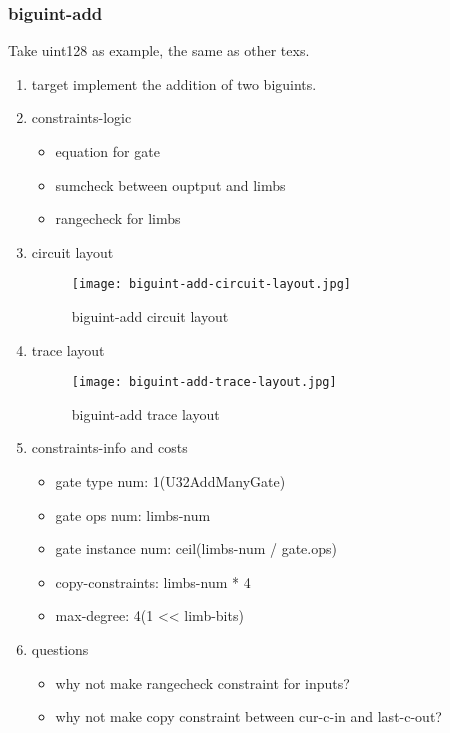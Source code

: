 \subsubsection{biguint-add}
\label{biguint-add}

Take uint128 as example, the same as other texs.

\begin{enumerate}
    \item target
        implement the addition of two biguints.
    \item constraints-logic
        \begin{itemize}
            \item equation for gate
            \item sumcheck between ouptput and limbs
            \item rangecheck for limbs
        \end{itemize}
    \item circuit layout
        \begin{figure}[!ht]
            \centering
            \texttt{[image: biguint-add-circuit-layout.jpg]}
            \caption{biguint-add circuit layout}
            \label{fig:biguint-add-circuit-layout}
        \end{figure}

    \item trace layout
        \begin{figure}[!ht]
            \centering
            \texttt{[image: biguint-add-trace-layout.jpg]}
            \caption{biguint-add trace layout}
            \label{fig:biguint-add-trace-layout}
        \end{figure}
    
    \item constraints-info and costs
        \begin{itemize}
            \item gate type num: 1(U32AddManyGate)
            \item gate ops num: limbs-num
            \item gate instance num: ceil(limbs-num / gate.ops)
            \item copy-constraints: limbs-num * 4
            \item max-degree: 4(1 << limb-bits)
        \end{itemize}

    \item questions
        \begin{itemize}
            \item why not make rangecheck constraint for inputs?
            \item why not make copy constraint between cur-c-in and last-c-out?
        \end{itemize}

\end{enumerate}